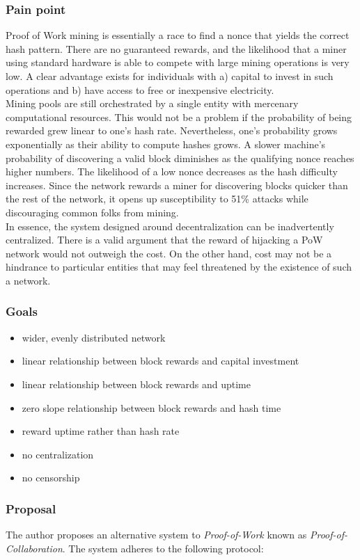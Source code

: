 \documentclass[10pt,twocolumn]{article}
\begin{document}
\subsubsection{Pain point}
Proof of Work mining is essentially a race to find a nonce that yields the correct hash pattern. 
There are no guaranteed rewards, and the likelihood that a miner using standard hardware is able to compete with large mining operations is very low. A clear advantage exists for individuals with a) capital to invest in such operations and b) have access to free or inexpensive electricity. \\
Mining pools are still orchestrated by a single entity with mercenary computational resources.
This would not be a problem if the probability of being rewarded grew linear to one's hash rate. Nevertheless, one’s probability grows exponentially as their ability to compute hashes grows. A slower machine's probability of discovering a valid block diminishes as the qualifying nonce reaches higher numbers. The likelihood of a low nonce decreases as the hash difficulty increases. Since the network rewards a miner for discovering blocks quicker than the rest of the network, it opens up susceptibility to 51\% attacks\cite{btcwiki:weaknesses} while discouraging common folks from mining.\\
In essence, the system designed around decentralization can be inadvertently centralized. There is a valid argument that the reward of hijacking a PoW network would not outweigh the cost\cite{btcwiki:weaknesses}. On the other hand, cost may not be a hindrance to particular entities that may feel threatened by the existence of such a network.
\subsubsection{Goals}
\begin{itemize}
\item wider, evenly distributed network
\item linear relationship between block rewards and capital investment
\item linear relationship between block rewards and uptime
\item zero slope relationship between block rewards and hash time
\item reward uptime rather than hash rate
\item no centralization
\item no censorship
\end{itemize}
\subsubsection{Proposal}
The author proposes an alternative system to \textit{Proof-of-Work} known as \textit{Proof-of-Collaboration}.  The system adheres to the following protocol:
\end{document}
